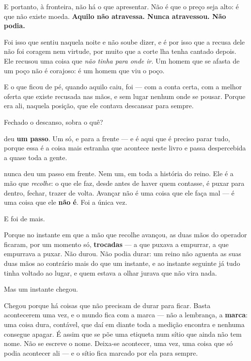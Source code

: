 \documentclass[livro.tex]{subfiles}
\begin{document}
E portanto, à fronteira, não há o que apresentar. Não é que o preço seja alto: é que não
existe moeda. \textbf{Aquilo não atravessa. Nunca atravessou. Não podia.}

\medskip

Foi isso que \Ben sentiu naquela noite e não soube dizer, e é por isso que a recusa dele
não foi coragem nem virtude, por muito que a corte lha tenha cantado depois. Ele recusou
uma coisa que \emph{não tinha para onde ir}. Um homem que se afasta de um poço não é
corajoso: é um homem que viu o poço.

E o que ficou de pé, quando aquilo caiu, foi \Drk --- com a conta certa, com a melhor
oferta que existe recusada nas mãos, e sem lugar nenhum onde se pousar. Porque era ali,
naquela posição, que ele contava descansar para sempre.

Fechado o descanso, sobra o quê?

\medskip

\Drk deu \textbf{um passo}. Um só, e para a frente --- e é aqui que é preciso parar tudo,
porque essa é a coisa mais estranha que acontece neste livro e passa despercebida a quase
toda a gente.

\Drk nunca deu um passo em frente. Nem um, em toda a história do reino. Ele é a mão que
\emph{recolhe}: o que ele faz, desde antes de haver quem contasse, é puxar para dentro,
fechar, trazer de volta. Avançar não é uma coisa que ele faça mal --- é uma coisa que ele
\textbf{não é}. Foi a única vez.

E foi de mais.

Porque no instante em que a mão que recolhe avançou, as duas mãos do operador ficaram, por
um momento só, \textbf{trocadas} --- a que puxava a empurrar, a que empurrava a puxar. Não
durou. Não podia durar: um reino não aguenta as suas duas mãos ao contrário mais do que um
instante, e ao instante seguinte já tudo tinha voltado ao lugar, e quem estava a olhar
jurava que não vira nada.

Mas um instante chegou.

\medskip

Chegou porque há coisas que não precisam de durar para ficar. Basta acontecerem uma vez, e
o mundo fica com a marca --- não a lembrança, a \textbf{marca}: uma coisa dura, contável,
que daí em diante toda a medição encontra e nenhuma consegue apagar. É assim que se põe
uma etiqueta num sítio que ainda não tem nome. Não se escreve o nome. Deixa-se acontecer,
uma vez, uma coisa que só podia acontecer ali --- e o sítio fica marcado por ela para
sempre.
\end{document}
